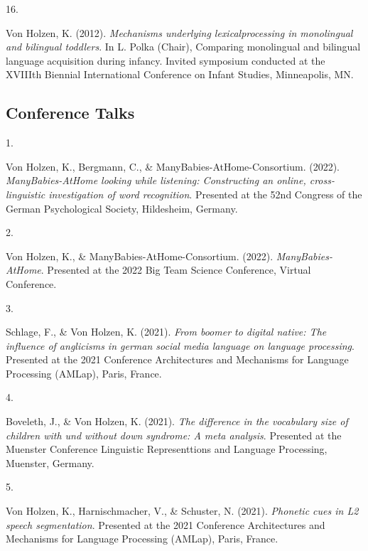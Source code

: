 \documentclass[10pt,a4paper,]{article}
\newlength{\cslhangindent}
\newlength{\csllabelwidth}
\newcommand{\CSLLeftMargin}[1]{\parbox[t]{\csllabelwidth}{\hfill #1~}}
\newcommand{\CSLRightInline}[1]{\parbox[t]{\linewidth - \cslhangindent - \csllabelwidth}{#1}\vspace{0.8ex}}
\begin{document}
\leavevmode{}%
\CSLLeftMargin{16. }%
\CSLRightInline{Von Holzen, K. (2012). \emph{Mechanisms underlying
lexicalprocessing in monolingual and bilingual toddlers}. In L. Polka
(Chair), Comparing monolingual and bilingual language acquisition during
infancy. Invited symposium conducted at the XVIIIth Biennial
International Conference on Infant Studies, Minneapolis, MN.}

\hypertarget{conference-talks}{%
\subsection{Conference Talks}\label{conference-talks}}

\hypertarget{bibliography}{}
\leavevmode{}%
\CSLLeftMargin{1. }%
\CSLRightInline{Von Holzen, K., Bergmann, C., \&
ManyBabies-AtHome-Consortium. (2022). \emph{ManyBabies-AtHome looking
while listening: Constructing an online, cross-linguistic investigation
of word recognition}. Presented at the 52nd Congress of the German
Psychological Society, Hildesheim, Germany.}

\leavevmode{}%
\CSLLeftMargin{2. }%
\CSLRightInline{Von Holzen, K., \& ManyBabies-AtHome-Consortium. (2022).
\emph{ManyBabies-AtHome}. Presented at the 2022 Big Team Science
Conference, Virtual Conference.}

\leavevmode{}%
\CSLLeftMargin{3. }%
\CSLRightInline{Schlage, F., \& Von Holzen, K. (2021). \emph{From boomer
to digital native: The influence of anglicisms in german social media
language on language processing}. Presented at the 2021 Conference
Architectures and Mechanisms for Language Processing (AMLap), Paris,
France.}

\leavevmode{}%
\CSLLeftMargin{4. }%
\CSLRightInline{Boveleth, J., \& Von Holzen, K. (2021). \emph{The
difference in the vocabulary size of children with und without down
syndrome: A meta analysis}. Presented at the Muenster Conference
Linguistic Representtions and Language Processing, Muenster, Germany.}

\leavevmode{}%
\CSLLeftMargin{5. }%
\CSLRightInline{Von Holzen, K., Harnischmacher, V., \& Schuster, N.
(2021). \emph{Phonetic cues in L2 speech segmentation}. Presented at the
2021 Conference Architectures and Mechanisms for Language Processing
(AMLap), Paris, France.}
\end{document}
